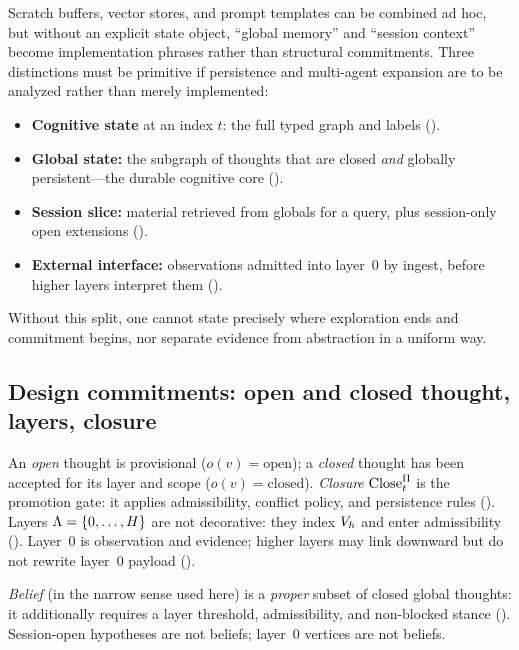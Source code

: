 Scratch buffers, vector stores, and prompt templates can be combined ad hoc, but without an explicit state object, ``global memory'' and ``session context'' become implementation phrases rather than structural commitments.
Three distinctions must be primitive if persistence and multi-agent expansion are to be analyzed rather than merely implemented:
\begin{itemize}[leftmargin=*]
  \item \textbf{Cognitive state} at an index $t$: the full typed graph and labels ().
  \item \textbf{Global state:} the subgraph of thoughts that are closed \emph{and} globally persistent---the durable cognitive core ().
  \item \textbf{Session slice:} material retrieved from globals for a query, plus session-only open extensions ().
  \item \textbf{External interface:} observations admitted into layer~$0$ by ingest, before higher layers interpret them ().
\end{itemize}
Without this split, one cannot state precisely where exploration ends and commitment begins, nor separate evidence from abstraction in a uniform way.

\subsection{Design commitments: open and closed thought, layers, closure}
\label{subsec:intro-design}

An \emph{open} thought is provisional ($o(v)=\text{open}$); a \emph{closed} thought has been accepted for its layer and scope ($o(v)=\text{closed}$).
\emph{Closure} $\mathrm{Close}_t^{\Pi}$ is the promotion gate: it applies admissibility, conflict policy, and persistence rules ().
Layers $\Lambda=\{0,\ldots,H\}$ are not decorative: they index $V_{h}$ and enter admissibility ().
Layer~$0$ is observation and evidence; higher layers may link downward but do not rewrite layer~$0$ payload ().

\emph{Belief} (in the narrow sense used here) is a \emph{proper} subset of closed global thoughts: it additionally requires a layer threshold, admissibility, and non-blocked stance ().
Session-open hypotheses are not beliefs; layer~$0$ vertices are not beliefs.

